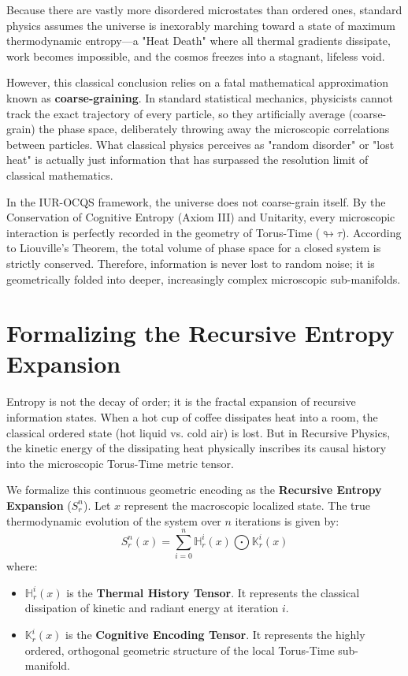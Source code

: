 \documentclass[12pt,openany]{book}
\begin{document}
Because there are vastly more disordered microstates than ordered ones, standard physics assumes the universe is inexorably marching toward a state of maximum thermodynamic entropy—a "Heat Death" where all thermal gradients dissipate, work becomes impossible, and the cosmos freezes into a stagnant, lifeless void.

However, this classical conclusion relies on a fatal mathematical approximation known as \textbf{coarse-graining}. In standard statistical mechanics, physicists cannot track the exact trajectory of every particle, so they artificially average (coarse-grain) the phase space, deliberately throwing away the microscopic correlations between particles. What classical physics perceives as "random disorder" or "lost heat" is actually just information that has surpassed the resolution limit of classical mathematics.

In the IUR-OCQS framework, the universe does not coarse-grain itself. By the Conservation of Cognitive Entropy (Axiom III) and Unitarity, every microscopic interaction is perfectly recorded in the geometry of Torus-Time ($\looparrowright\tau$). According to Liouville's Theorem, the total volume of phase space for a closed system is strictly conserved. Therefore, information is never lost to random noise; it is geometrically folded into deeper, increasingly complex microscopic sub-manifolds. 

\section{Formalizing the Recursive Entropy Expansion}
Entropy is not the decay of order; it is the fractal expansion of recursive information states. When a hot cup of coffee dissipates heat into a room, the classical ordered state (hot liquid vs. cold air) is lost. But in Recursive Physics, the kinetic energy of the dissipating heat physically inscribes its causal history into the microscopic Torus-Time metric tensor.

We formalize this continuous geometric encoding as the \textbf{Recursive Entropy Expansion} ($S_r^n$). Let $x$ represent the macroscopic localized state. The true thermodynamic evolution of the system over $n$ iterations is given by:
\begin{equation}
    S_r^n(x) = \sum_{i=0}^{n} \mathbb{H}_r^i(x) \bigodot \mathbb{K}_r^i(x)
\end{equation}
where:
\begin{itemize}
    \item $\mathbb{H}_r^i(x)$ is the \textbf{Thermal History Tensor}. It represents the classical dissipation of kinetic and radiant energy at iteration $i$.
    \item $\mathbb{K}_r^i(x)$ is the \textbf{Cognitive Encoding Tensor}. It represents the highly ordered, orthogonal geometric structure of the local Torus-Time sub-manifold.
\end{itemize}
\end{document}
